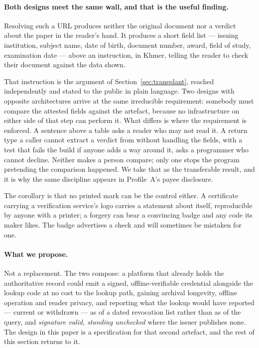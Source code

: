 \documentclass[10pt,a4paper,twocolumn]{article}
\begin{document}
\paragraph{Both designs meet the same wall, and that is the useful finding.}
Resolving such a URL produces neither the original document nor a verdict about
the paper in the reader's hand. It produces a short field list --- issuing
institution, subject name, date of birth, document number, award, field of
study, examination date --- above an instruction, in Khmer, telling the reader to
check their document against the data shown.

That instruction is the argument of Section~\ref{sec:transplant}, reached
independently and stated to the public in plain language. Two designs with
opposite architectures arrive at the same irreducible requirement: somebody must
compare the attested fields against the artefact, because no infrastructure on
either side of that step can perform it. What differs is where the requirement
is enforced. A sentence above a table asks a reader who may not read it. A
return type a caller cannot extract a verdict from without handling the fields,
with a test that fails the build if anyone adds a way around it, asks a
programmer who cannot decline. Neither makes a person compare; only one stops
the program pretending the comparison happened. We take that as the transferable
result, and it is why the same discipline appears in Profile~A's payee
disclosure.

The corollary is that no printed mark can be the control either. A certificate
carrying a verification service's logo carries a statement about itself,
reproducible by anyone with a printer; a forgery can bear a convincing badge and
any code its maker likes. The badge advertises a check and will sometimes be
mistaken for one.

\paragraph{What we propose.} Not a replacement. The two compose: a platform that
already holds the authoritative record could emit a signed, offline-verifiable
credential alongside the lookup code at no cost to the lookup path, gaining
archival longevity, offline operation and reader privacy, and reporting what
the lookup would have reported --- current or withdrawn --- as of a dated
revocation list rather than as of the query, and \emph{signature valid,
standing unchecked} where the issuer publishes none. The design in this paper
is a specification for that second artefact, and the rest of this section
returns to it.
\end{document}
